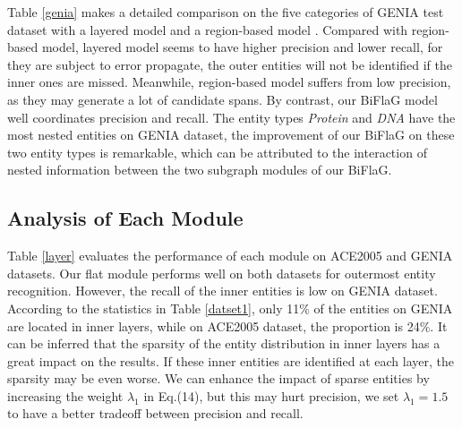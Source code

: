 \documentclass[11pt,a4paper]{article}
\begin{document}
Table \ref{genia} makes a detailed comparison on the five categories of GENIA test dataset with a layered model \cite{ju2018neural} and a region-based model \cite{zheng2019boundary}.
Compared with region-based model, layered model seems to have higher precision and lower recall, for they are subject to error propagate, the outer entities will not be identified if the inner ones are missed. Meanwhile, region-based model suffers from low precision, as they may generate a lot of candidate spans. By contrast, our BiFlaG model well coordinates precision and recall. The entity types \textit{Protein} and \textit{DNA} have the most nested entities on GENIA dataset, the improvement of our BiFlaG on these two entity types is remarkable, which can be attributed to the interaction of nested information between the two subgraph modules of our BiFlaG.

\subsection{Analysis of Each Module}
Table \ref{layer} evaluates the performance of each module on ACE2005 and GENIA datasets. Our flat module performs well on both datasets for outermost entity recognition. However, the recall of the inner entities is low on GENIA dataset.
According to the statistics in Table \ref{datset1}, only 11\% of the entities on GENIA are located in inner layers, while on ACE2005 dataset, the proportion is 24\%.
It can be inferred that the sparsity of the entity distribution in inner layers has a great impact on the results. If these inner entities are identified at each layer, the sparsity may be even worse.
We can enhance the impact of sparse entities by increasing the weight $\lambda_1$ in Eq.(14), but this may hurt precision, we set $ \lambda_1=1.5 $ to have a better tradeoff between precision and recall.

\begin{table}[h!]
\caption{Performance of each module on ACE2005 and GENIA datasets.}
\label{layer}
\end{table}  
\end{document}
